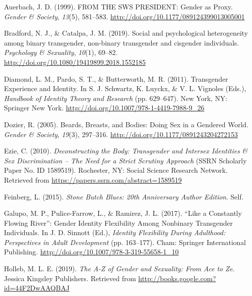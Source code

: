 \documentclass[12pt,twoside]{reedthesis}
\newlength{\cslhangindent}
\newenvironment{cslreferences}%
  {\setlength{\parindent}{0pt}%
  \everypar{\setlength{\hangindent}{\cslhangindent}}\ignorespaces}%
  {\par}
\begin{document}
\hypertarget{refs}{}
\begin{cslreferences}
\leavevmode\hypertarget{ref-auerbachSWSPRESIDENTGender1999}{}%
Auerbach, J. D. (1999). FROM THE SWS PRESIDENT: Gender as Proxy. \emph{Gender \& Society}, \emph{13}(5), 581--583. \url{http://doi.org/10.1177/089124399013005001}

\leavevmode\hypertarget{ref-bradfordSocialPsychologicalHeterogeneity2019}{}%
Bradford, N. J., \& Catalpa, J. M. (2019). Social and psychological heterogeneity among binary transgender, non-binary transgender and cisgender individuals. \emph{Psychology \& Sexuality}, \emph{10}(1), 69--82. \url{http://doi.org/10.1080/19419899.2018.1552185}

\leavevmode\hypertarget{ref-diamondTransgenderExperienceIdentity2011}{}%
Diamond, L. M., Pardo, S. T., \& Butterworth, M. R. (2011). Transgender Experience and Identity. In S. J. Schwartz, K. Luyckx, \& V. L. Vignoles (Eds.), \emph{Handbook of Identity Theory and Research} (pp. 629--647). New York, NY: Springer New York. \url{http://doi.org/10.1007/978-1-4419-7988-9_26}

\leavevmode\hypertarget{ref-dozierBeardsBreastsBodies2005}{}%
Dozier, R. (2005). Beards, Breasts, and Bodies: Doing Sex in a Gendered World. \emph{Gender \& Society}, \emph{19}(3), 297--316. \url{http://doi.org/10.1177/0891243204272153}

\leavevmode\hypertarget{ref-ezieDeconstructingBodyTransgender2010}{}%
Ezie, C. (2010). \emph{Deconstructing the Body: Transgender and Intersex Identities \& Sex Discrimination -- The Need for a Strict Scrutiny Approach} (SSRN Scholarly Paper No. ID 1589519). Rochester, NY: Social Science Research Network. Retrieved from \url{https://papers.ssrn.com/abstract=1589519}

\leavevmode\hypertarget{ref-feinbergStoneButchBlues2015}{}%
Feinberg, L. (2015). \emph{Stone Butch Blues: 20th Anniversary Author Edition}. Self.

\leavevmode\hypertarget{ref-galupoConstantlyFlowingRiver2017}{}%
Galupo, M. P., Pulice-Farrow, L., \& Ramirez, J. L. (2017). ``Like a Constantly Flowing River'': Gender Identity Flexibility Among Nonbinary Transgender Individuals. In J. D. Sinnott (Ed.), \emph{Identity Flexibility During Adulthood: Perspectives in Adult Development} (pp. 163--177). Cham: Springer International Publishing. \url{http://doi.org/10.1007/978-3-319-55658-1_10}

\leavevmode\hypertarget{ref-hollebAZGenderSexuality2019}{}%
Holleb, M. L. E. (2019). \emph{The A-Z of Gender and Sexuality: From Ace to Ze}. Jessica Kingsley Publishers. Retrieved from \url{http://books.google.com?id=44F2DwAAQBAJ}


\end{cslreferences}
\end{document}
